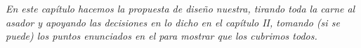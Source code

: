 
\textit{En este capítulo hacemos la propuesta de diseño nuestra, tirando toda la carne al asador y apoyando las decisiones en lo dicho en el capítulo II, tomando (si se puede) los puntos enunciados en el  para mostrar que los cubrimos todos.}
